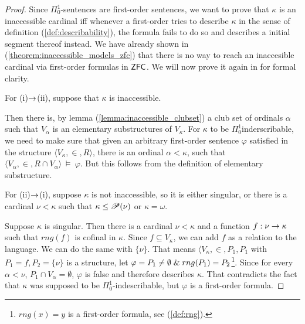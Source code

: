 

\begin{proof}
Since $\Pi^1_0$-sentences are first-order sentences, we want to prove that $\kappa$ is an inaccessible cardinal iff whenever a first-order tries to describe $\kappa$ in the sense of definition (\ref{def:describability}), the formula fails to do so and describes a initial segment thereof instead.
We have already shown in (\ref{theorem:inaccessible_models_zfc}) that there is no way to reach an inaccesible cardinal via first-order formulas in $\sf{ZFC}$. We will now prove it again in for formal clarity.

For (i)$\rightarrow$(ii), suppose that $\kappa$ is inaccessible.

Then there is, by lemma (\ref{lemma:inaccessible_clubset}) a club set of ordinals $\alpha$ such that $V_\alpha$ is an elementary substructures of $V_\kappa$. For $\kappa$ to be $\Pi^1_0$inderscribable, we need to make sure that given an arbitrary first-order sentence $\varphi$ satisfied in the structure $\langle V_\kappa, \in, R \rangle$, there is an ordinal $\alpha < \kappa$, such that $\langle V_\alpha, \in, R \cap V_\alpha \rangle~\models~\varphi$. But this follows from the definition of elementary substructure.

For (ii)$\rightarrow$(i), suppose $\kappa$ is not inaccessible, so it is either singular, or there is a cardinal $\nu < \kappa$ such that $\kappa \leq \mathscr{P} (\nu)$ or $\kappa=\omega$. 


Suppose $\kappa$ is singular. Then there is a cardinal $\nu < \kappa$ and a function $f: \nu \rightarrow \kappa$ such that $rng(f)$ is cofinal in $\kappa$. Since $f \subseteq V_\kappa$, we can add $f$ as a relation to the language. We can do the same with $\{\nu\}$. That means $\langle V_\kappa, \in, P_1, P_1$ with $P_1 = f, P_2 = \{\nu\}$ is a structure, 
let $\varphi = P_1 \neq \emptyset \mathrel{\&} rng(P_1) = P_2$\footnote{$rng(x)=y$ is a first-order formula, see (\ref{def:rng}).}. Since for every $\alpha < \nu$, $P_1 \cap V_\alpha = \emptyset$, $\varphi$ is false and therefore describes $\kappa$. That contradicts the fact that $\kappa$ was supposed to be $\Pi^1_0$-indescribable, but $\varphi$ is a first-order formula.


\end{proof}
